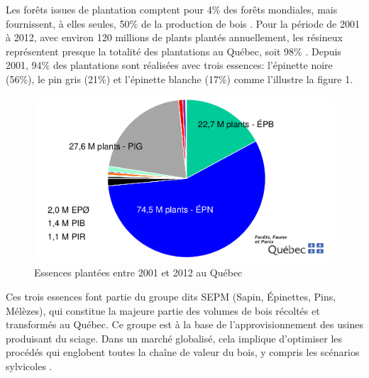 \documentclass[letterpaper, 12pt]{article}
\begin{document}
\begin{onehalfspace}

Les forêts issues de plantation comptent pour 4\% des forêts mondiales, mais fournissent, à elles seules, 50\% de la production de bois \cite{Miller2009}. Pour la période de 2001 à 2012, avec environ 120 millions de plants plantés annuellement, les résineux représentent presque la totalité des plantations au Québec, soit 98\% \cite{Richard2015}. Depuis 2001, 94\% des plantations sont réalisées avec trois essences: l'épinette noire (56\%), le pin gris (21\%) et l'épinette blanche (17\%) comme l'illustre la figure 1. 

\vspace{12pt}

\begin{figure}[h]
	\centering
	\includegraphics[width=12cm]{Essencesplantees}
	\caption{Essences plantées entre 2001 et 2012 au Québec}
\end{figure}


Ces trois essences font partie du groupe dits SEPM (Sapin, Épinettes, Pins, Mélèzes), qui constitue la  majeure  partie  des  volumes  de  bois  récoltés et transformés au Québec. Ce groupe est à la base de l’approvisionnement des usines produisant du sciage\cite{Gouv2017}. Dans un marché globalisé, cela implique d'optimiser les procédés qui englobent toutes la chaîne de valeur du bois, y compris les scénarios sylvicoles \cite{Gaudreault2010}. 

\vspace{12pt}


\end{onehalfspace}
\end{document}
